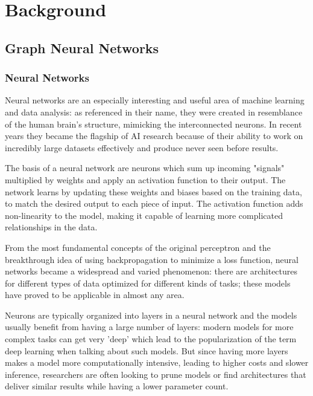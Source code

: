 \chapter{Background}

\section{Graph Neural Networks}

	

	\subsection{Neural Networks}
	
	Neural networks are an especially interesting and useful area of machine learning and data analysis: as referenced in their name, they were created in resemblance of the human brain's structure, mimicking the interconnected neurons. In recent years they became the flagship of AI research because of their ability to work on incredibly large datasets effectively and produce never seen before results. 
	
	The basis of a neural network are neurons which sum up incoming "signals" multiplied by weights and apply an activation function to their output. The network learns by updating these weights and biases based on the training data, to match the desired output to each piece of input. The activation function adds non-linearity to the model, making it capable of learning more complicated relationships in the data.
	
	From the most fundamental concepts of the original perceptron and the breakthrough idea of using backpropagation to minimize a loss function, neural networks became a widespread and varied phenomenon: there are architectures for different types of data optimized for different kinds of tasks; these models have proved to be applicable in almost any area.
	
	
	
	Neurons are typically organized into layers in a neural network and the models usually benefit from having a large number of layers: modern models for more complex tasks can get very 'deep' which lead to the popularization of the term deep learning when talking about such models. But since having more layers makes a model more computationally intensive, leading to higher costs and slower inference, researchers are often looking to prune models or find architectures that deliver similar results while having a lower parameter count.
	
